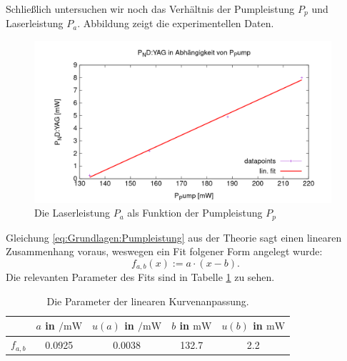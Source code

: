 \documentclass[../../../main.tex]{subfiles}
\begin{document}
    Schließlich untersuchen wir noch das Verhältnis der Pumpleistung $P_p$ und Laserleistung $P_a$. Abbildung zeigt die experimentellen Daten.

    \begin{figure}[H]
        \centering
        \includegraphics[width=11cm]{../../Bilddateien/5/P(NDYAG)overP(Pump).png}
        \caption{Die Laserleistung $P_a$ als Funktion der Pumpleistung $P_p$}
        \label{fig:PumpLaserLeistung}
    \end{figure}

    Gleichung \eqref{eq:Grundlagen:Pumpleistung} aus der Theorie sagt einen linearen Zusammenhang voraus, weswegen ein Fit folgener Form angelegt wurde:
    \[
        f_{a,b}(x) := a\cdot (x - b).      
    \]
    Die relevanten Parameter des Fits sind in Tabelle \ref{tab:PumpLaserLeistungFitParameter} zu sehen.

    \begin{table}[H]
        \centering
        \begin{tabular}{c|cc |cc}
            \hline
            & $a$ in $\si{\per\milli\W}$ & $u(a)$ in $\si{\per\milli\W}$ & $b$ in $\si{\milli\W}$ & $u(b)$ in $\si{\milli\W}$\\
            \hline\hline
            $f_{a, b}$ & 0.0925 & 0.0038 & 132.7 & 2.2
        \end{tabular}
        \caption{Die Parameter der linearen Kurvenanpassung.}
        \label{tab:PumpLaserLeistungFitParameter}
    \end{table}
\end{document}

